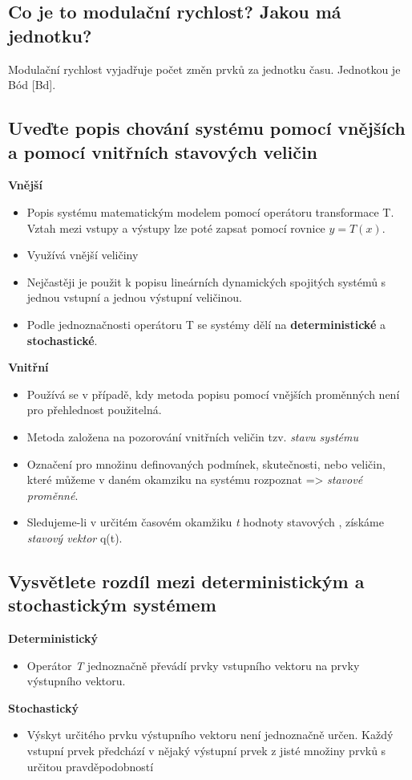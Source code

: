 \subsection{Co je to modulační rychlost? Jakou má jednotku?}
Modulační rychlost vyjadřuje počet změn prvků za jednotku času. Jednotkou je Bód [Bd].

\subsection{Uveďte popis chování systému pomocí vnějších a pomocí vnitřních stavových veličin}
\textbf{Vnější}
\begin{itemize}
    \item Popis systému matematickým modelem pomocí operátoru transformace T. Vztah mezi vstupy a výstupy lze poté zapsat pomocí rovnice $y=T(x)$.
    \item Využívá vnější veličiny
    \item Nejčastěji je použit k popisu lineárních dynamických  spojitých systémů s jednou vstupní a jednou výstupní veličinou.
    \item Podle jednoznačnosti operátoru T se systémy dělí na \textbf{deterministické} a \textbf{stochastické}.
    
\end{itemize}

\textbf{Vnitřní}
\begin{itemize}
    \item Používá se v případě, kdy metoda popisu pomocí vnějších proměnných není pro přehlednost použitelná.
    \item Metoda založena na pozorování vnitřních veličin tzv. \textit{stavu systému}
    \item Označení pro množinu definovaných podmínek, skutečnosti, nebo veličin, které můžeme v daném okamziku na systému rozpoznat => \textit{stavové proměnné}.
    \item Sledujeme-li v určitém časovém okamžiku \textit{t} hodnoty stavových , získáme \textit{stavový vektor} q(t).
\end{itemize}

\subsection{Vysvětlete rozdíl mezi deterministickým a stochastickým systémem}

\textbf{Deterministický}
\begin{itemize}
    \item Operátor \emph{T} jednoznačně převádí prvky vstupního vektoru na prvky výstupního vektoru.

\end{itemize}
\textbf{Stochastický}
\begin{itemize}
    \item Výskyt určitého prvku výstupního vektoru není jednoznačně určen.
    Každý vstupní prvek předchází v nějaký výstupní prvek z jisté množiny prvků s určitou pravděpodobností
    
\end{itemize}